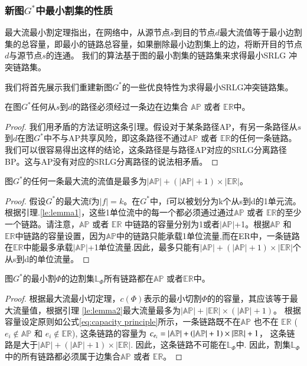 \subsubsection{新图$G^*$中最小割集的性质}
最大流最小割定理指出，在网络中，从源节点$s$到目的节点$d$最大流值等于最小边割集的总容量，即最小的链路总容量，如果删除最小边割集上的边，将断开目的节点$d$与源节点$s$的连通。 我们的算法基于图的最小割集的链路集来求得最小SRLG 冲突链路集。

我们将首先展示我们重建新图$G^*$的一些优良特性为求得最小SRLG冲突链路集。

\begin{lemma}
\label{le:lemma1}
    在图$G^*$任何从$s$到$d$的路径必须经过一条边在边集合 $\mathbb{AP}$ 或者 $\mathbb{\mathbb{ER}}$中。
\end{lemma}
\begin{proof}
我们用矛盾的方法证明这条引理。假设对于某条路径AP，有另一条路径从$s$到$d$在图$G^*$中不与AP共享风险，即这条路径不通过$\mathbb{AP}$ 或者 $\mathbb{\mathbb{ER}}$的任何一条链路。我们可以很容易得出这样的结论，这条路径是与路径AP对应的SRLG分离路径BP。这与AP没有对应的SRLG分离路径的说法相矛盾。
\end{proof}

\begin{lemma}
\label{le:lemma2}
    图$G^*$的任何一条最大流的流值是最多为$|\mathbb{AP}|+(|\mathbb{AP}|+1)\times|\mathbb{\mathbb{ER}}|$。
\end{lemma}
\begin{proof}
假设$G^*$的最大流f为$|f|=k$。在$G^*$中，f可以被划分为k个从s到d的1单元流。根据引理.\ref{le:lemma1}，这些1单位流中的每一个都必须通过通过$\mathbb{AP}$ 或者 $\mathbb{\mathbb{ER}}$的至少一个链路。请注意，$\mathbb{AP}$ 或者 $\mathbb{\mathbb{ER}}$ 中链路的容量分别为1或者$|\mathbb{AP}|$+1。根据$\mathbb{AP}$ 和 $\mathbb{\mathbb{ER}}$中链路的容量设置，因为$\mathbb{AP}$中的链路只能承载1单位流量,而在ER中，一条链路在$\mathbb{ER}$中能最多承载$|\mathbb{AP}|$+1单位流量.因此，最多只能有$|\mathbb{AP}|+ (|\mathbb{AP}|+1)\times|\mathbb{\mathbb{ER}}|$个从s到d的单位流量。
\end{proof}

\begin{lemma}
\label{le:lemma3}
    图$G^*$的最小割$\Phi$的边割集$\mathbb{L}_{\Phi}$所有链路都在$\mathbb{AP}$ 或者$\mathbb{\mathbb{ER}}$中。
\end{lemma}

\begin{proof}
根据最大流最小切定理，$c(\Phi)$表示的最小切割$\Phi$的的容量，其应该等于最大流量值，根据引理 \ref{le:lemma2}最大流量最多为$|\mathbb{AP}|+ |\mathbb{ER}|\times (|\mathbb{AP}|+1)$。 根据容量设定原则如公式\ref{eq:capacity principle}所示，一条链路既不在$\mathbb{AP}$ 也不在 $\mathbb{ER}$ ($e_i \notin \mathbb{AP}$ 和 $e_i \notin \mathbb{ER}$), 这条链路的容量为 $c_{e_i} = \left| {{\rm\mathbb{AP}}} \right| + \left( {\left| {{\rm\mathbb{AP}}} \right| + 1} \right)\times \left| {{\rm{\mathbb{E}}}{{\rm{\mathbb{R}}}}} \right| + 1$， 这条链路是大于$|\mathbb{AP}|+(|\mathbb{AP}|+1)\times |\mathbb{ER}|$. 因此，这条链路不可能在$\mathbb{L}_{\Phi}$中. 因此，割集$\mathbb{L}_{\Phi}$中的所有链路都必须属于边集合$\mathbb{AP}$ 或者 $\mathbb{ER}$。
\end{proof}


